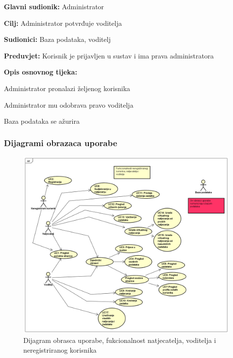 					\noindent {}
					\begin{packed_item}
						
						\item \textbf{Glavni sudionik: }Administrator
						\item  \textbf{Cilj:} Administrator potvrđuje voditelja 
						\item  \textbf{Sudionici:} Baza podataka, voditelj
						\item  \textbf{Preduvjet:} Korisnik je prijavljen u sustav i ima prava administratora
						\item  \textbf{Opis osnovnog tijeka:}
						
						\item[] \begin{packed_enum}
							
							\item Administrator pronalazi željenog korisnika
							\item Administrator mu odobrava pravo voditelja
							\item Baza podataka se ažurira
							
						\end{packed_enum}
					\end{packed_item}
					
					\eject
				
					
				\subsubsection{Dijagrami obrazaca uporabe}
					\begin{figure}[H]
						\includegraphics[scale=0.45]{slike/Korisnik_voditelj_natjecatelj.PNG} %
						\centering
						\caption{Dijagram obrasca uporabe, fukcionalnost natjecatelja, voditelja i neregistriranog korisnika}
						\label{fig:obrasci1}
					\end{figure}
					

